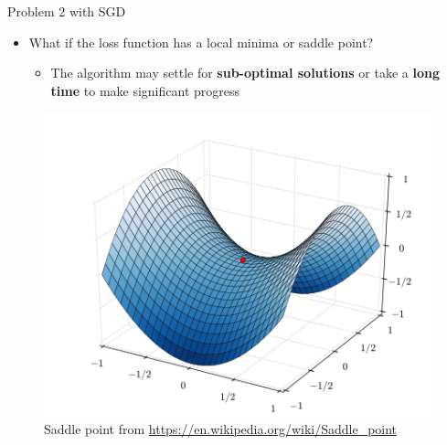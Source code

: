 \documentclass[serif, aspectratio=169]{beamer}
\begin{document}
\begin{frame}{Problem 2 with SGD}
    \begin{minipage}{0.4\textwidth}
        \begin{itemize}
        \item What if the loss function has a local minima or saddle point?
        \begin{itemize}
            \item The algorithm may settle for \textbf{sub-optimal solutions} or take a \textbf{long time} to make significant progress
        \end{itemize}
        \end{itemize}
    \end{minipage}%
    \begin{minipage}{0.6\textwidth}
        \centering
        \begin{center}
        \begin{figure}
        \centering
            \includegraphics[width=0.75\linewidth]{pic/saddle_wiki.png}
            \caption{\footnotesize Saddle point from \url{https://en.wikipedia.org/wiki/Saddle_point}}
        \end{figure}
        \end{center}
    \end{minipage}
\end{frame}
\end{document}
